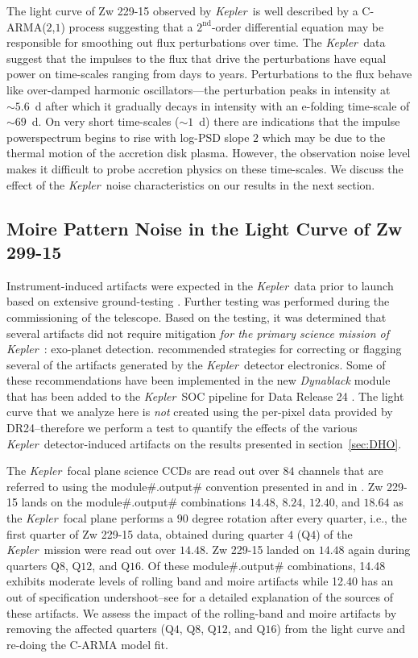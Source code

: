 \documentclass[a4paper,fleqn,usenatbib]{mnras}
\newcommand{\Kepler}{\textit{Kepler~}}
\begin{document}
The light curve of Zw 229-15 observed by \Kepler is well described by a C-ARMA($2$,$1$) process suggesting that a $2^{\mathrm{nd}}$-order differential equation may be responsible for smoothing out flux perturbations over time. The \Kepler data suggest that the impulses to the flux that drive the perturbations have equal power on time-scales ranging from days to years. Perturbations to the flux behave like over-damped harmonic oscillators---the perturbation peaks in intensity at $\sim 5.6$~d after which it gradually decays in intensity with an $\mathrm{e}$-folding time-scale of $\sim 69$~d. On very short time-scales ($\sim 1$~d) there are indications that the impulse powerspectrum begins to rise with log-PSD slope $2$ which may be due to the thermal motion of the accretion disk plasma. However, the observation noise level makes it difficult to probe accretion physics on these time-scales. We discuss the effect of the \Kepler noise characteristics on our results in the next section.

\subsection[Moire Pattern Noise]{Moire Pattern Noise in the Light Curve of Zw 299-15}\label{sec:MPD}

Instrument-induced artifacts were expected in the \Kepler data prior to launch based on extensive ground-testing \citep{Kol10}. Further testing was performed during the commissioning of the telescope. Based on the testing, it was determined that several artifacts did not require mitigation \textit{for the primary science mission of} \Kepler: exo-planet detection. \citet{Kol10} recommended strategies for correcting or flagging several of the artifacts generated by the \Kepler detector electronics. Some of these recommendations have been implemented in the new \textit{Dynablack} module \citep{Clarke14} that has been added to the \Kepler SOC pipeline for Data Release 24 \citep{DR24}. The light curve that we analyze here is \textit{not} created using the per-pixel data provided by DR24--therefore we perform a test to quantify the effects of the various \Kepler detector-induced artifacts on the results presented in section~\ref{sec:DHO}.

The \Kepler focal plane science CCDs are read out over $84$ channels that are referred to using the module\#.output\# convention presented in \citet{KIH} and in \citet{Kasliwal15}. Zw 229-15 lands on the module\#.output\# combinations $14$.$48$, $8$.$24$, $12$.$40$, and $18$.$64$ as the \Kepler focal plane performs a $90$ degree rotation after every quarter, i.e., the first quarter of Zw 229-15 data, obtained during quarter $4$ (Q$4$) of the \Kepler mission were read out over $14$.$48$. Zw 229-15 landed on $14$.$48$ again during quarters Q$8$, Q$12$, and Q$16$. Of these module\#.output\# combinations, 14.48 exhibits moderate levels of rolling band and moire artifacts while 12.40 has an out of specification undershoot--see \citet{KIH} for a detailed explanation of the sources of these artifacts. We assess the impact of the rolling-band and moire artifacts by removing the affected quarters (Q$4$, Q$8$, Q$12$, and Q$16$) from the light curve and re-doing the C-ARMA model fit.
\end{document}
